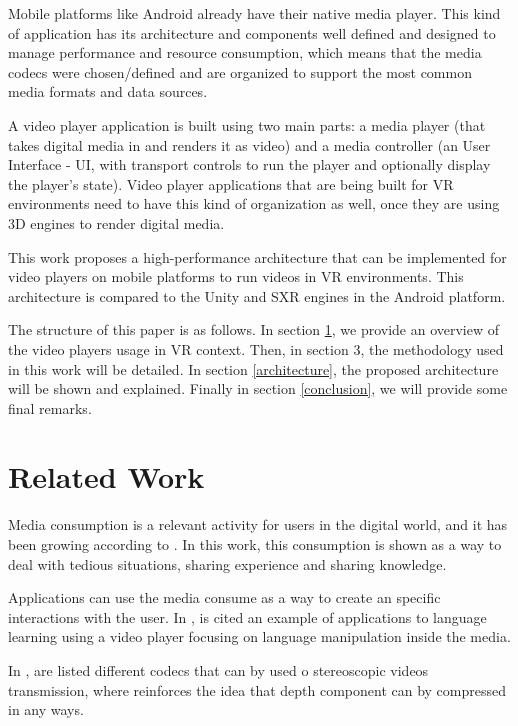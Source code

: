 \documentclass[runningheads]{llncs}
\begin{document}
Mobile platforms like Android already have their native media player. This kind of application has its architecture and components well defined and designed to manage performance and resource consumption, which means that the media codecs were chosen/defined and are organized to support the most common media formats and data sources.

A video player application is built using two main parts: a media player (that takes digital media in and renders it as video) and a media controller (an User Interface - UI, with transport controls to run the player and optionally display the player's state). Video player applications that are being built for VR environments need to have this kind of organization as well, once they are using 3D engines to render digital media.

This work proposes a high-performance architecture that can be implemented for video players on mobile platforms to run videos in VR environments. This architecture is compared to the Unity and SXR engines in the Android platform.

The structure of this paper is as follows. In section \ref{related-work}, we provide an overview of the video players usage in VR context. Then, in section 3, the methodology used in this work will be detailed. In section \ref{architecture}, the proposed architecture will be shown and explained. Finally in section \ref{conclusion}, we will provide some final remarks.


\section{Related Work} \label{related-work}


Media consumption is a relevant activity for users in the digital world, and it has been growing according to \cite{repo2004users}. In this work, this consumption is shown as a way to deal with tedious situations, sharing experience and sharing knowledge.

Applications can use the media consume as a way to create an specific interactions with the user. In \cite{hu2018kalgan}, is cited an example of applications to language learning using a video player focusing on language manipulation inside the media.

In \cite{smolic2009overview}, are listed different codecs that can by used o stereoscopic videos transmission, where reinforces the idea that depth component can by compressed in any ways.
\end{document}
